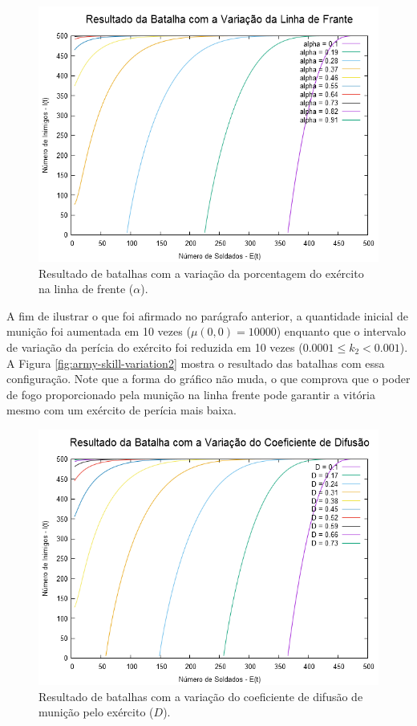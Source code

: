 \documentclass{article}
\begin{document}
\begin{figure}[ht]
	\centering
	\includegraphics[scale=0.3]{figs/battle_front_line_variation.png}
	\caption{Resultado de batalhas com a variação da porcentagem do exército na linha de frente ($\alpha$).}
	\label{fig:front-line-size-variation}
\end{figure}

A fim de ilustrar o que foi afirmado no parágrafo anterior, a quantidade inicial de munição foi aumentada em 10 vezes ($\mu(0,0) = 10000$) enquanto que o intervalo de variação da perícia do exército foi reduzida em 10 vezes ($0.0001 \leq k_2 < 0.001$). A Figura \ref{fig:army-skill-variation2} mostra o resultado das batalhas com essa configuração. Note que a forma do gráfico não muda, o que comprova que o poder de fogo proporcionado pela munição na linha frente pode garantir a vitória mesmo com um exército de perícia mais baixa.

\begin{figure}[ht]
	\centering
	\includegraphics[scale=0.3]{figs/battle_ammo_diffusion_variation.png}
	\caption{Resultado de batalhas com a variação do coeficiente de difusão de munição pelo exército ($D$).}
	\label{fig:ammo-diffusion-variation}
\end{figure}
\end{document}

